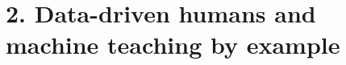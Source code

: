 \documentclass[justified]{tufte-handout}
\begin{document}

\section{2. Data-driven humans and machine teaching by example}



\end{document}
